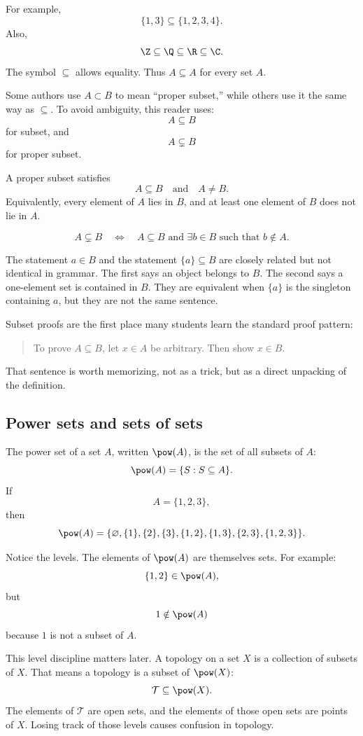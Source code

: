 For example,
\[
\{1,3\}\subseteq\{1,2,3,4\}.
\]
Also,
\[
\Z\subseteq\Q\subseteq\R\subseteq\C.
\]
The symbol $\subseteq$ allows equality. Thus $A\subseteq A$ for every set $A$.

Some authors use $A\subset B$ to mean ``proper subset,'' while others use it the same way as $\subseteq$. To avoid ambiguity, this reader uses:
\[
A\subseteq B
\]
for subset, and
\[
A\subsetneq B
\]
for proper subset.

A proper subset satisfies
\[
A\subseteq B\quad\text{and}\quad A\neq B.
\]
Equivalently, every element of $A$ lies in $B$, and at least one element of $B$ does not lie in $A$.

\[
A\subsetneq B\quad\Longleftrightarrow\quad A\subseteq B\text{ and }\exists b\in B\text{ such that }b\notin A.
\]

\begin{trapbox}
The statement $a\in B$ and the statement $\{a\}\subseteq B$ are closely related but not identical in grammar. The first says an object belongs to $B$. The second says a one-element set is contained in $B$. They are equivalent when $\{a\}$ is the singleton containing $a$, but they are not the same sentence.
\end{trapbox}

Subset proofs are the first place many students learn the standard proof pattern:

\begin{quote}
To prove $A\subseteq B$, let $x\in A$ be arbitrary. Then show $x\in B$.
\end{quote}

That sentence is worth memorizing, not as a trick, but as a direct unpacking of the definition.

\subsection{Power sets and sets of sets}

The power set of a set $A$, written $\pow(A)$, is the set of all subsets of $A$:
\[
\pow(A)=\{S:S\subseteq A\}.
\]
If
\[
A=\{1,2,3\},
\]
then
\[
\pow(A)=\{\varnothing,\{1\},\{2\},\{3\},\{1,2\},\{1,3\},\{2,3\},\{1,2,3\}\}.
\]

Notice the levels. The elements of $\pow(A)$ are themselves sets. For example:
\[
\{1,2\}\in\pow(A),
\]
but
\[
1\notin\pow(A)
\]
because $1$ is not a subset of $A$.

This level discipline matters later. A topology on a set $X$ is a collection of subsets of $X$. That means a topology is a subset of $\pow(X)$:
\[
\mathcal{T}\subseteq\pow(X).
\]
The elements of $\mathcal{T}$ are open sets, and the elements of those open sets are points of $X$. Losing track of those levels causes confusion in topology.

